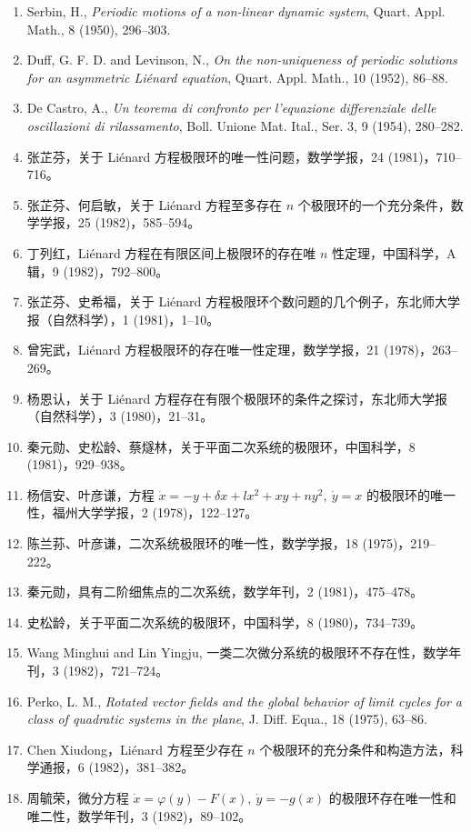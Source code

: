 \begin{enumerate}
\item Serbin, H., \emph{Periodic motions of a non-linear dynamic system}, Quart. Appl. Math., 8 (1950), 296--303.
\item Duff, G. F. D. and Levinson, N., \emph{On the non-uniqueness of periodic solutions for an asymmetric Liénard equation}, Quart. Appl. Math., 10 (1952), 86--88.
\item De Castro, A., \emph{Un teorema di confronto per l'equazione differenziale delle oscillazioni di rilassamento}, Boll. Unione Mat. Ital., Ser. 3, 9 (1954), 280--282.
\item 张芷芬，关于 Liénard 方程极限环的唯一性问题，数学学报，24 (1981)，710--716。
\item 张芷芬、何启敏，关于 Liénard 方程至多存在 $n$ 个极限环的一个充分条件，数学学报，25 (1982)，585--594。
\item 丁列红，Liénard 方程在有限区间上极限环的存在唯 $n$ 性定理，中国科学，A 辑，9 (1982)，792--800。
\item 张芷芬、史希福，关于 Liénard 方程极限环个数问题的几个例子，东北师大学报（自然科学），1 (1981)，1--10。
\item 曾宪武，Liénard 方程极限环的存在唯一性定理，数学学报，21 (1978)，263--269。
\item 杨恩认，关于 Liénard 方程存在有限个极限环的条件之探讨，东北师大学报（自然科学），3 (1980)，21--31。
\item 秦元勋、史松龄、蔡燧林，关于平面二次系统的极限环，中国科学，8 (1981)，929--938。
\item 杨信安、叶彦谦，方程 $\dot x=-y+\delta x+lx^2+xy+ny^2,\ \dot y=x$ 的极限环的唯一性，福州大学学报，2 (1978)，122--127。
\item 陈兰荪、叶彦谦，二次系统极限环的唯一性，数学学报，18 (1975)，219--222。
\item 秦元勋，具有二阶细焦点的二次系统，数学年刊，2 (1981)，475--478。
\item 史松龄，关于平面二次系统的极限环，中国科学，8 (1980)，734--739。
\item Wang Minghui and Lin Yingju, 一类二次微分系统的极限环不存在性，数学年刊，3 (1982)，721--724。
\item Perko, L. M., \emph{Rotated vector fields and the global behavior of limit cycles for a class of quadratic systems in the plane}, J. Diff. Equa., 18 (1975), 63--86.
\item Chen Xiudong，Liénard 方程至少存在 $n$ 个极限环的充分条件和构造方法，科学通报，6 (1982)，381--382。
\item 周毓荣，微分方程 $\dot x=\varphi(y)-F(x),\ \dot y=-g(x)$ 的极限环存在唯一性和唯二性，数学年刊，3 (1982)，89--102。

\end{enumerate}
